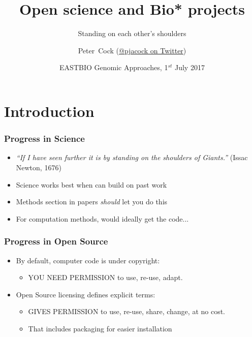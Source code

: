 


\title[Open science and Bio* projects] %
{Open science and Bio* projects}
\subtitle{Standing on each other's shoulders}
\author[Cock] %
{Peter~Cock (\href{https://twitter.com/pjacock}{@pjacock on Twitter})}
\date[July 2017] %
{EASTBIO Genomic Approaches, 1$^{st}$ July 2017}
\subject{Bioinformatics}





\frame[plain]{\titlepage}

\section{Introduction}

\begin{frame}
  \frametitle{Progress in Science}
  \begin{itemize}
    \item \emph{``If I have seen further it is by standing on the shoulders of Giants.''} (Issac Newton, 1676)
    \item Science works best when can build on past work
    \item Methods section in papers \emph{should} let you do this
    \item For computation methods, would ideally get the code...
  \end{itemize}
\end{frame}

\begin{frame}
  \frametitle{Progress in Open Source}
  \begin{itemize}
    \item By default, computer code is under copyright:
      \begin{itemize}
        \item YOU NEED PERMISSION to use, re-use, adapt.
      \end{itemize}
    \item Open Source licensing defines explicit terms:
      \begin{itemize}
        \item GIVES PERMISSION to use, re-use, share, change, at no cost.
        \item That includes packaging for easier installation
      \end{itemize}
  \end{itemize}
\end{frame}

